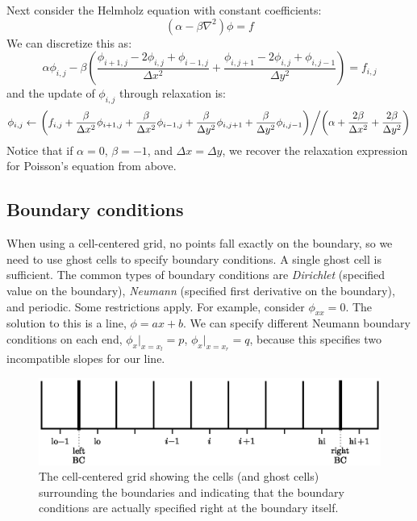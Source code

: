 Next consider the Helmholz equation with constant coefficients:
\begin{equation}
(\alpha - \beta \nabla^2) \phi = f
\end{equation}
We can discretize this as:
\begin{equation}
\alpha \phi_{i,j} - \beta \left ( 
    \frac{\phi_{i+1,j} - 2 \phi_{i,j} + \phi_{i-1,j}}{\Delta x^2} +
    \frac{\phi_{i,j+1} - 2 \phi_{i,j} + \phi_{i,j-1}}{\Delta y^2} \right )
= f_{i,j}
\end{equation}
and the update of $\phi_{i,j}$ through relaxation is:
\begin{equation}
\phi_{i,j} \leftarrow
     \left . \left ( f_{i,j} + \frac{\beta}{\Delta x^2} \phi_{i+1,j}
                             + \frac{\beta}{\Delta x^2} \phi_{i-1,j}
                             + \frac{\beta}{\Delta y^2} \phi_{i,j+1}
                             + \frac{\beta}{\Delta y^2} \phi_{i,j-1} \right ) 
\middle / \left ( \alpha + \frac{2 \beta}{\Delta x^2} + \frac{2 \beta}{\Delta y^2} \right ) \right .
\end{equation}
Notice that if $\alpha = 0$, $\beta = -1$, and $\Delta x = \Delta y$, we 
recover the relaxation expression for Poisson's equation from above.


\subsection{Boundary conditions}

When using a cell-centered grid, no points fall exactly on the
boundary, so we need to use ghost cells to specify boundary conditions.
A single ghost cell is sufficient.  The common types of boundary
conditions are {\em Dirichlet} (specified value on the boundary), {\em
  Neumann} (specified first derivative on the boundary), and periodic.
Some restrictions apply.  For example, consider $\phi_{xx} = 0$.  The
solution to this is a line, $\phi = ax + b$.  We can specify different
Neumann boundary conditions on each end, $\phi_x |_{x=x_l} = p$,
$\phi_x |_{x = x_r} = q$, because this specifies two incompatible
slopes for our line.

\begin{figure}[h]
\centering
\includegraphics[width=\linewidth]{mg-bcs}
\caption[The cell-centered grid showing the difference between ghost
  cells and the physical boundary.]{\label{fig:bcs} The cell-centered
  grid showing the cells (and ghost cells) surrounding the boundaries
  and indicating that the boundary conditions are actually specified
  right at the boundary itself.}
\end{figure}

